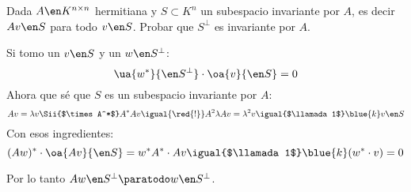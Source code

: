 \begin{enunciado}{\ejercicio}
  Dada $A \en K^{n \times n}$ hermitiana y $S \subset K^n$ un subespacio invariante por $A$, es decir
  $Av \en S$ para todo $v \en S$. Probar que $S^\perp$ es invariante por $A$.
\end{enunciado}

Si tomo un $v \en S$ y un $w \en S^\perp$:
$$
  \ua{w^*}{\en S^\perp} \cdot \oa{v}{\en S} = 0
$$
Ahora que sé que $S$ es un subespacio invariante por $A$:
$$
  Av = \lambda v
  \Sii{$\times A^*$}
  A^*A v \igual{\red{!}}
  A^2 \lambda Av = \lambda^2 v \igual{$\llamada1$} \blue{k} v \en S
$$
Con esos ingredientes:
$$
  (Aw)^* \cdot \oa{Av}{\en S} =
  w^* A^* \cdot Av
  \igual{$\llamada1$}
  \blue{k} (w^* \cdot v) = 0
$$

Por lo tanto $Aw \en S^\perp \paratodo w \en S^\perp$.

\begin{aportes}
  \item {}
\end{aportes}
